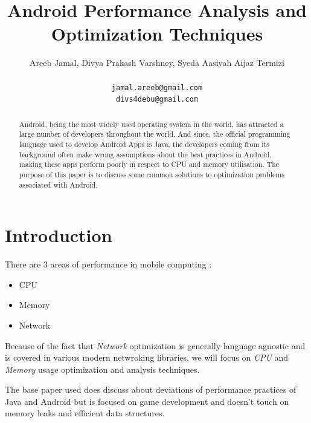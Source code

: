 \documentclass[journal]{IEEEtran}
\begin{document}
\title{Android Performance Analysis and \\ Optimization Techniques}

\author{
	Areeb Jamal, Divya Prakash Varshney, Syeda Aasiyah Aijaz Termizi\\[3ex]
	\\[3ex]
	\texttt{jamal.areeb@gmail.com}\\
	\texttt{divs4debu@gmail.com}
}




\maketitle


\begin{abstract}
Android, being the most widely used operating system in the world, has attracted a large number of developers throughout the world. And since, the official programming language used to develop Android Apps is Java, the developers coming from its background often make wrong assumptions about the best practices in Android, making these apps perform poorly in respect to CPU and memory utilisation. The purpose of this paper is to discuss some common solutions to optimization problems associated with Android.
\end{abstract}


\section{Introduction}
There are 3 areas of performance in mobile computing :
\begin{itemize}
	\item CPU
	\item Memory
	\item Network
\end{itemize}
Because of the fact that \emph{Network} optimization is generally language agnostic and is covered in various modern netwroking libraries, we will focus on \emph{CPU} and \emph{Memory} usage optimization and analysis techniques.

The base paper \cite{base} used does discuss about deviations of performance practices of Java and Android but is focused on game development and doesn't touch on memory leaks and efficient data structures.
\end{document}
